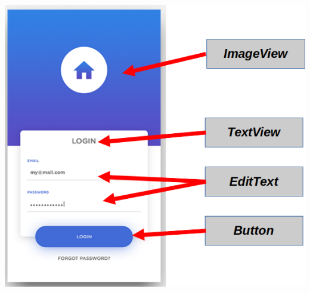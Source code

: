 \begin{frame}
\begin{columns}

\begin{center}
\includegraphics[width=0.95\linewidth]{00_Modificacion/ElementosInterfaz.png}    
\end{center}

\end{columns}

\end{frame}



